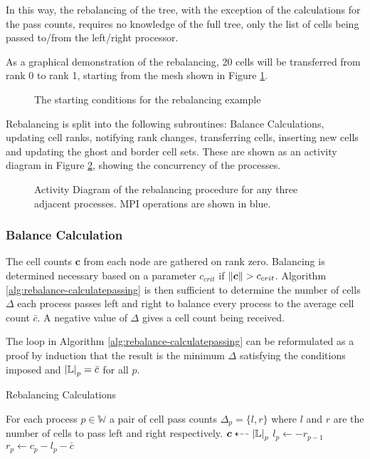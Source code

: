 \documentclass{IIBproject}
\newcommand{\vect}[1]{\bm{#1}}
\newcommand{\dla}{\dashleftarrow}
\begin{document}
In this way, the rebalancing of the tree, with the exception of the calculations for the pass counts, requires no knowledge of the full tree, only the list of cells being passed to/from the left/right processor. 

As a graphical demonstration of the rebalancing, 20 cells will be transferred from rank 0 to rank 1, starting from the mesh shown in Figure \ref{fig:rebalance-init}.

\begin{figure}[H]
	\label{fig:rebalance-init}
	\caption{The starting conditions for the rebalancing example}
	
\end{figure}

Rebalancing is split into the following subroutines: Balance Calculations, updating cell ranks, notifying rank changes, transferring cells, inserting new cells and updating the ghost and border cell sets. These are shown as an activity diagram in Figure \ref{fig:rebalance-overview}, showing the concurrency of the processes.

\begin{figure}[H]
	\label{fig:rebalance-overview}
	\caption{Activity Diagram of the rebalancing procedure for any three adjacent processes. MPI operations are shown in blue.}
	
\end{figure}


\subsubsection{Balance Calculation}
\label{sec:rebalancing-calc}

The cell counts $\vect{c}$ from each node are gathered on rank zero. Balancing is determined necessary based on a parameter $c_{crit}$ if $\norm{\vect{c}}>c_{crit}$. Algorithm \ref{alg:rebalance-calculatepassing} is then sufficient to determine the number of cells $\Delta$ each process passes left and right to balance every process to the average cell count $\bar c$. A negative value of $\Delta$ gives a cell count being received. 

The loop in Algorithm \ref{alg:rebalance-calculatepassing} can be reformulated as a proof by induction that the result is the minimum $\Delta$ satisfying the conditions imposed and $\abs{\mathbb{L}}_p=\bar c$ for all $p$.

\begin{algorithm}[H]
\caption{Rebalancing Calculations}
\label{alg:rebalance-calculatepassing}

\begin{algorithmic}
\Ensure For each process $p \in \mathbb{W}$ a pair of cell pass counts $\Delta_p = \{l,r\}$ where $l$ and $r$ are the number of cells to pass left and right respectively.
\Statex
\Gather $\vect{c} \dla \abs{\mathbb{L}}_p $
	\State $l_p \gets -r_{p-1}$
	\State $r_p \gets c_p - l_p - \bar{c}$
\EndFor
\end{algorithmic}
\end{algorithm}
\end{document}
